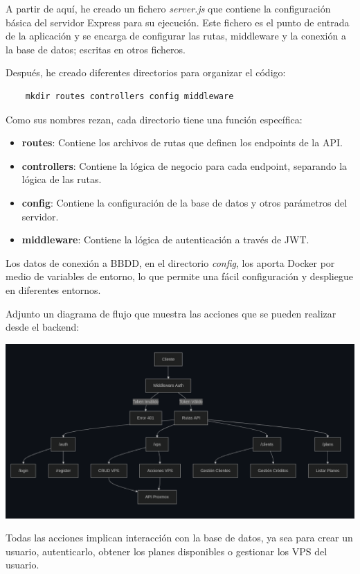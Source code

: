 \documentclass[11pt,oneside,a4paper]{book}
\begin{document}
A partir de aquí, he creado un fichero \textit{server.js} que contiene la configuración básica del servidor Express para su ejecución. Este fichero es el punto de entrada de la aplicación y se encarga de configurar las rutas, middleware y la conexión a la base de datos; escritas en otros ficheros.

Después, he creado diferentes directorios para organizar el código:
\begin{verbatim}
    mkdir routes controllers config middleware
\end{verbatim} 

Como sus nombres rezan, cada directorio tiene una función específica:
\begin{itemize}
    \item \textbf{routes}: Contiene los archivos de rutas que definen los endpoints de la API.
    \item \textbf{controllers}: Contiene la lógica de negocio para cada endpoint, separando la lógica de las rutas.
    \item \textbf{config}: Contiene la configuración de la base de datos y otros parámetros del servidor.
    \item \textbf{middleware}: Contiene la lógica de autenticación a través de JWT.
\end{itemize}

Los datos de conexión a BBDD, en el directorio \textit{config}, los aporta Docker por medio de variables de entorno, lo que permite una fácil configuración y despliegue en diferentes entornos.

Adjunto un diagrama de flujo que muestra las acciones que se pueden realizar desde el backend:
\begin{center}
\includegraphics[width=14cm]{img/diagrama_backend.png}
\end{center}

Todas las acciones implican interacción con la base de datos, ya sea para crear un usuario, autenticarlo, obtener los planes disponibles o gestionar los VPS del usuario.
\end{document}
